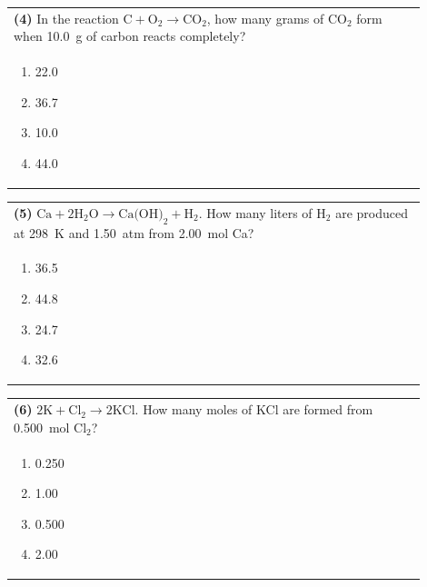 \documentclass{article}
\begin{document}
{{\vspace{0.2cm}
\noindent\begin{tabular}{|p{0.9\linewidth}|}
\hline
\textbf{(4)} In the reaction $\text{C} + \text{O}_2 \rightarrow \text{CO}_2$, how many grams of CO$_2$ form when 10.0~g of carbon reacts completely?\\[0.2cm]

\begin{minipage}[t]{0.85\linewidth}
\begin{enumerate}[label=\alph*.]
\item 22.0
\item 36.7
\item 10.0
\item 44.0
\end{enumerate}
\end{minipage}\\[0.2cm]
\hline
\end{tabular}
\newpage

\noindent\begin{tabular}{|p{0.9\linewidth}|}
\hline
\textbf{(5)} $\text{Ca} + 2\text{H}_2\text{O} \rightarrow \text{Ca(OH)}_2 + \text{H}_2$. How many liters of H$_2$ are produced at 298~K and 1.50~atm from 2.00~mol Ca?\\[0.2cm]

\begin{minipage}[t]{0.85\linewidth}
\begin{enumerate}[label=\alph*.]
\item 36.5
\item 44.8
\item 24.7
\item 32.6
\end{enumerate}
\end{minipage}\\[0.2cm]
\hline
\end{tabular}

\vspace{0.2cm}
\noindent\begin{tabular}{|p{0.9\linewidth}|}
\hline
\textbf{(6)} $2\text{K} + \text{Cl}_2 \rightarrow 2\text{KCl}$. How many moles of KCl are formed from 0.500~mol Cl$_2$?\\[0.2cm]

\begin{minipage}[t]{0.85\linewidth}
\begin{enumerate}[label=\alph*.]
\item 0.250
\item 1.00
\item 0.500
\item 2.00
\end{enumerate}
\end{minipage}\\[0.2cm]
\hline
\end{tabular}

}}
\end{document}
